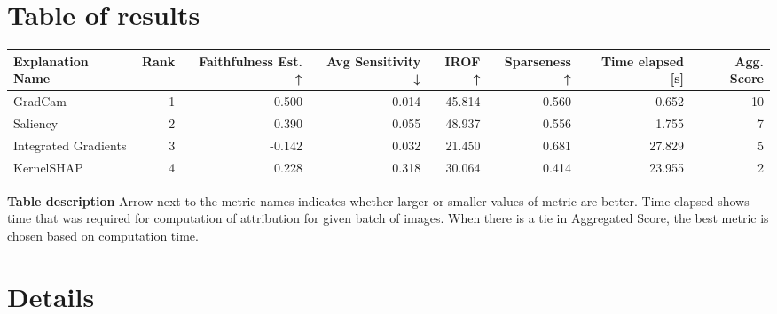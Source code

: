 \documentclass{article}%
\begin{document}
\section*{Table of results}%
\label{sec:Tableofresults}%
\begin{footnotesize}%
\begin{flushleft} %
\begin{tabular}{lrrrrrrr}
\toprule
    Explanation Name &  Rank &  Faithfulness Est. ↑ &  Avg Sensitivity ↓ &  IROF ↑ &  Sparseness ↑ &  Time elapsed [s] &  Agg. Score \\
\midrule
             GradCam &     1 &                0.500 &              0.014 &  45.814 &         0.560 &             0.652 &          10 \\
            Saliency &     2 &                0.390 &              0.055 &  48.937 &         0.556 &             1.755 &           7 \\
Integrated Gradients &     3 &               -0.142 &              0.032 &  21.450 &         0.681 &            27.829 &           5 \\
          KernelSHAP &     4 &                0.228 &              0.318 &  30.064 &         0.414 &            23.955 &           2 \\
\bottomrule
\end{tabular}
%
\end{flushleft}%
\end{footnotesize}%
\textbf{Table description \newline%
}%
Arrow next to the metric names indicates whether larger or smaller values of metric are better. Time elapsed shows time that was required for computation of attribution for given batch of images. When there is a tie in Aggregated Score, the best metric is chosen based on computation time.

%
\newpage%
\section*{Details}%
\label{sec:Details}%
\end{document}
